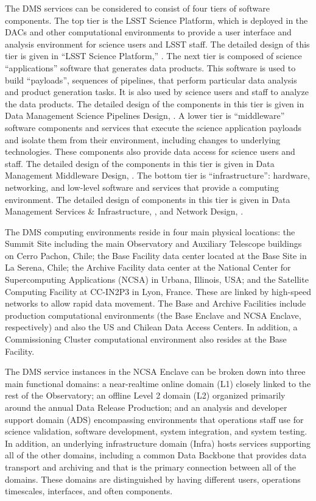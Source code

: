\documentclass[DM,toc]{lsstdoc}
\begin{document}
The DMS services can be considered to consist of four tiers of software
components. The top tier is the LSST Science Platform, which is deployed
in the DACs and other computational environments to provide a user
interface and analysis environment for science users and LSST staff. The
detailed design of this tier is given in ``LSST Science Platform,'' . The next
tier is composed of science ``applications'' software that generates
data products. This software is used to build ``payloads'', sequences of
pipelines, that perform particular data analysis and product generation
tasks. It is also used by science users and staff to analyze the data
products. The detailed design of the components in this tier is given in
Data Management Science Pipelines Design, . A lower tier is
``middleware'' software components and services that execute the science
application payloads and isolate them from their environment, including
changes to underlying technologies. These components also provide data
access for science users and staff. The detailed design of the
components in this tier is given in Data Management Middleware Design,
. The bottom tier is ``infrastructure'': hardware, networking,
and low-level software and services that provide a computing
environment. The detailed design of components in this tier is given in
Data Management Services \& Infrastructure, , and Network Design,
.

The DMS computing environments reside in four main physical locations:
the Summit Site including the main Observatory and Auxiliary Telescope
buildings on Cerro Pachon, Chile; the Base Facility data center located
at the Base Site in La Serena, Chile; the Archive Facility data center
at the National Center for Supercomputing Applications (NCSA) in Urbana,
Illinois, USA; and the Satellite Computing Facility at CC-IN2P3 in Lyon,
France. These are linked by high-speed networks to allow rapid data
movement. The Base and Archive Facilities include production
computational environments (the Base Enclave and NCSA Enclave,
respectively) and also the US and Chilean Data Access Centers. In
addition, a Commissioning Cluster computational environment also resides
at the Base Facility.

The DMS service instances in the NCSA Enclave can be broken down into
three main functional domains: a near-realtime online domain (L1)
closely linked to the rest of the Observatory; an offline Level 2 domain
(L2) organized primarily around the annual Data Release Production; and
an analysis and developer support domain (ADS) encompassing environments
that operations staff use for science validation, software development,
system integration, and system testing. In addition, an underlying
infrastructure domain (Infra) hosts services supporting all of the other
domains, including a common Data Backbone that provides data transport
and archiving and that is the primary connection between all of the
domains. These domains are distinguished by having different users,
operations timescales, interfaces, and often components.
\end{document}
